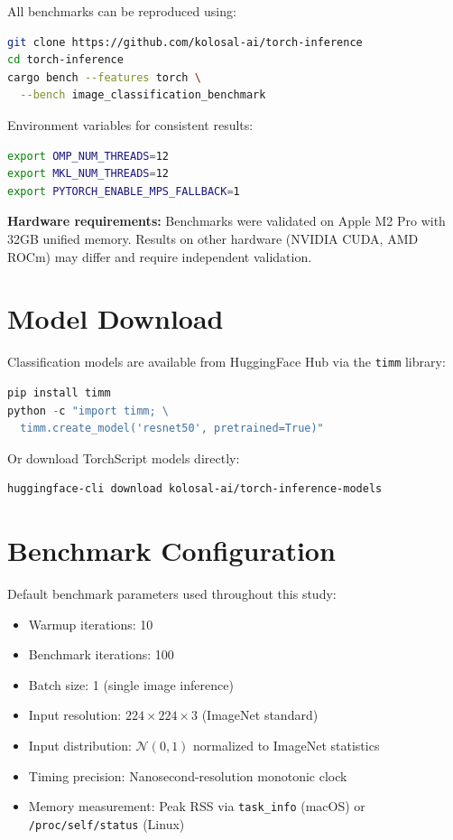 \documentclass[10pt,twocolumn,a4paper]{article}
\theoremstyle{definition}
\theoremstyle{plain}
\begin{document}
All benchmarks can be reproduced using:

\begin{lstlisting}[language=bash]
git clone https://github.com/kolosal-ai/torch-inference
cd torch-inference
cargo bench --features torch \
  --bench image_classification_benchmark
\end{lstlisting}

Environment variables for consistent results:
\begin{lstlisting}[language=bash]
export OMP_NUM_THREADS=12
export MKL_NUM_THREADS=12
export PYTORCH_ENABLE_MPS_FALLBACK=1
\end{lstlisting}

\textbf{Hardware requirements:} Benchmarks were validated on Apple M2 Pro with 32GB unified memory. Results on other hardware (NVIDIA CUDA, AMD ROCm) may differ and require independent validation.

\section{Model Download}
\label{app:models}

Classification models are available from HuggingFace Hub via the \texttt{timm} library:

\begin{lstlisting}[language=python]
pip install timm
python -c "import timm; \
  timm.create_model('resnet50', pretrained=True)"
\end{lstlisting}

Or download TorchScript models directly:
\begin{lstlisting}[language=bash]
huggingface-cli download kolosal-ai/torch-inference-models
\end{lstlisting}

\section{Benchmark Configuration}
\label{app:config}

Default benchmark parameters used throughout this study:
\begin{itemize}
    \item Warmup iterations: \num{10}
    \item Benchmark iterations: \num{100}
    \item Batch size: \num{1} (single image inference)
    \item Input resolution: $224 \times 224 \times 3$ (ImageNet standard)
    \item Input distribution: $\mathcal{N}(0, 1)$ normalized to ImageNet statistics
    \item Timing precision: Nanosecond-resolution monotonic clock
    \item Memory measurement: Peak RSS via \texttt{task\_info} (macOS) or \texttt{/proc/self/status} (Linux)
\end{itemize}
\end{document}
